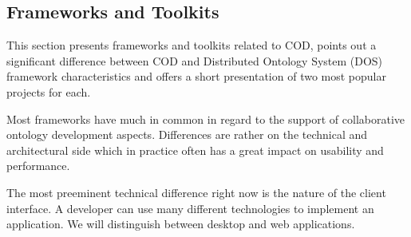 \subsection{Frameworks and Toolkits}
This section presents frameworks and toolkits related to COD, points out
a significant difference between COD and Distributed Ontology System (DOS)
framework characteristics and offers a short presentation of two most popular projects for each.

Most frameworks have much in common in regard to the support of collaborative
ontology development aspects. Differences are rather on the technical
and architectural side which in practice often has a great impact on usability
and performance.

The most preeminent technical difference right now is the nature of the
client interface.
A developer can use many different technologies to implement an application.
We will distinguish between desktop and web applications.

